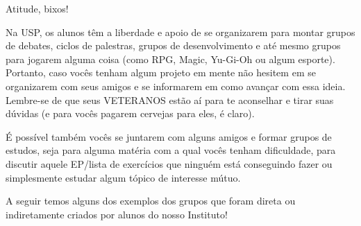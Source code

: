 \begin{secao}{Atitude, bixos!}

Na USP, os alunos têm a liberdade e apoio de se organizarem
para montar grupos de debates, ciclos de palestras, grupos
de desenvolvimento e até mesmo grupos para jogarem alguma coisa (como
RPG, Magic, Yu-Gi-Oh ou algum esporte).
Portanto, caso vocês tenham algum projeto em mente não hesitem
em se organizarem com seus amigos e se informarem em como avançar com essa
ideia. Lembre-se de que seus VETERANOS estão aí para te aconselhar e tirar suas
dúvidas (e para vocês pagarem cervejas para eles, é claro).

É possível também vocês se juntarem com alguns amigos e formar grupos de
estudos, seja para alguma matéria com a qual vocês tenham dificuldade, para
discutir aquele EP/lista de exercícios que ninguém está conseguindo
fazer ou simplesmente estudar algum tópico de interesse mútuo.

A seguir temos alguns dos exemplos dos grupos que foram direta ou indiretamente
criados por alunos do nosso Instituto!





\pagebreak


















\end{secao}
